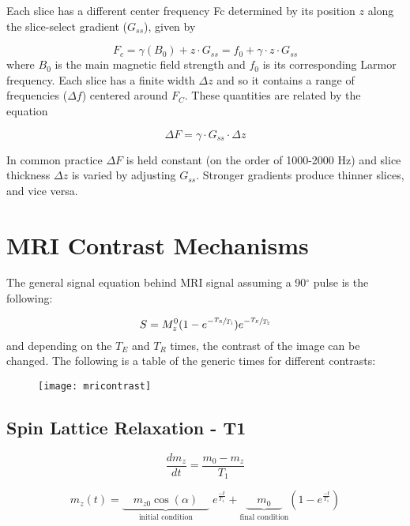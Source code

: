 Each slice has a different center frequency Fc determined by its position $z$ along the slice-select gradient ($G_{ss}$), given by  

\begin{equation}
	F_c = \gamma(B_0) + z \cdot G_{ss} = f_0 + \gamma \cdot z \cdot G_{ss}
\end{equation}
where $B_0$ is the main magnetic field strength and $f_0$ is its corresponding Larmor frequency. Each slice has a finite width $\Delta z$ and so it contains a range of frequencies ($\Delta f$) centered around $F_C$. These quantities are related by the equation 

\begin{equation}
	\Delta F = \gamma \cdot G_{ss} \cdot \Delta z
\end{equation}

In common practice $\Delta F$ is held constant (on the order of 1000-2000 Hz) and slice thickness $\Delta z$ is varied by adjusting $G_{ss}$. Stronger gradients produce thinner slices, and vice versa.

\section{MRI Contrast Mechanisms}
The general signal equation behind MRI signal assuming a 90$^\circ$ pulse is the following:

\begin{equation}
S = M_z^0(1-e^{-\sfrac{T_R}{T_1}})e^{-\sfrac{T_E}{T_2}}
\end{equation}
and depending on the $T_E$ and $T_R$ times, the contrast of the image can be changed. The following is a table of the generic times for different contrasts:

\begin{figure}[h]
	\begin{center}
		\texttt{[image: mricontrast]}	
	\end{center}
\end{figure}
\subsection{Spin Lattice Relaxation - T1}
\begin{equation}
\frac{dm_z}{dt}= \frac{m_0-m_z}{T_1}
\end{equation}

\begin{equation}
m_z(t) = \underset{\text{initial condition}}{\underbrace{\quad m_{z0}\cos\left(\alpha\right)\quad}}\; e^{\frac{-t}{T_1}} + \underset{\text{final condition}}{\underbrace{\quad m_0\quad}}\left(1-e^{\frac{-t}{T_1}}\right)
\end{equation}

